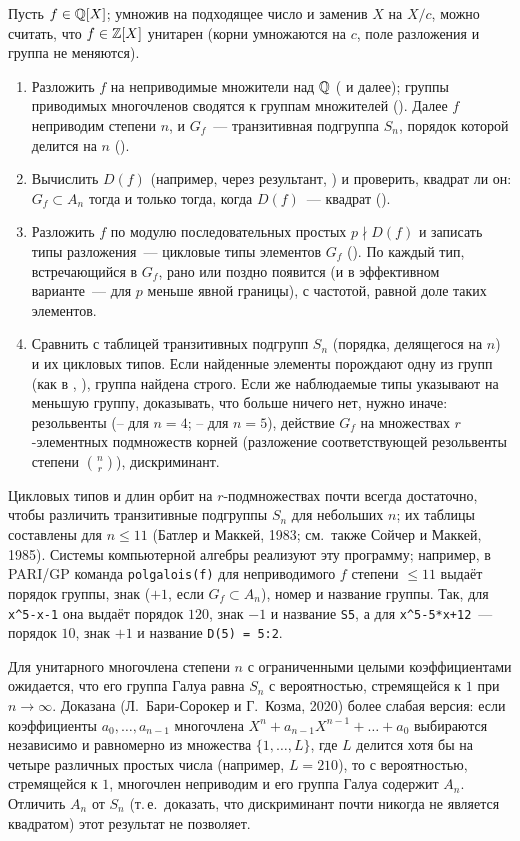 \begin{remark}
Пусть $f\in\mathbb Q[X]$; умножив на подходящее число и заменив $X$ на $X/c$, можно считать, что $f\in\mathbb Z[X]$ унитарен (корни
умножаются на $c$, поле разложения и группа не меняются).
\begin{enumerate}[leftmargin=*]
\item Разложить $f$ на неприводимые множители над $\mathbb Q$ ( и далее); группы приводимых многочленов сводятся к
группам множителей (). Далее $f$ неприводим степени $n$, и $G_f$~--- транзитивная подгруппа $S_n$, порядок
которой делится на $n$ ().
\item Вычислить $D(f)$ (например, через результант, ) и проверить, квадрат ли он: $G_f\subset A_n$ тогда и только
тогда, когда $D(f)$~--- квадрат ().
\item Разложить $f$ по модулю последовательных простых $p\nmid D(f)$ и записать типы разложения~--- цикловые типы
элементов $G_f$ (). По  каждый тип, встречающийся в $G_f$, рано или поздно появится (и в эффективном
варианте~--- для $p$ меньше явной границы), с частотой, равной доле таких элементов.
\item Сравнить с таблицей транзитивных подгрупп $S_n$ (порядка, делящегося на $n$) и их цикловых типов. Если
найденные элементы порождают одну из групп (как в , ), группа найдена строго. Если же наблюдаемые типы
указывают на меньшую группу, доказывать, что больше ничего нет, нужно иначе: резольвенты (-- для $n=4$; --
для $n=5$), действие $G_f$ на множествах $r$-элементных подмножеств корней
(разложение соответствующей резольвенты степени $\binom nr$), дискриминант.
\end{enumerate}
Цикловых типов и длин орбит на $r$-подмножествах почти всегда достаточно, чтобы различить транзитивные подгруппы $S_n$
для небольших $n$; их таблицы составлены для $n\le11$ (Батлер и Маккей, 1983; см.\ также Сойчер и Маккей, 1985). Системы
компьютерной алгебры реализуют эту программу; например, в PARI/GP команда \texttt{polgalois(f)} для неприводимого $f$
степени $\le11$ выдаёт порядок группы, знак ($+1$, если $G_f\subset A_n$), номер и название группы. Так,
для \texttt{x\^{}5-x-1} она выдаёт порядок $120$, знак $-1$ и название \texttt{S5}, а для \texttt{x\^{}5-5*x+12}~--- порядок
$10$, знак $+1$ и название \texttt{D(5) = 5:2}.
\end{remark}

\begin{aside}[4.33]
Для унитарного многочлена степени $n$ с ограниченными целыми коэффициентами ожидается, что его группа Галуа равна $S_n$
с вероятностью, стремящейся к $1$ при $n\to\infty$. Доказана (Л.~Бари-Сорокер и Г.~Козма, 2020) более слабая версия:
если коэффициенты $a_0,\dots,a_{n-1}$ многочлена $X^n+a_{n-1}X^{n-1}+\dots+a_0$ выбираются независимо и равномерно из
множества $\{1,\dots,L\}$, где $L$ делится хотя бы на четыре различных простых числа (например, $L=210$), то с
вероятностью, стремящейся к $1$, многочлен неприводим и его группа Галуа содержит $A_n$. Отличить $A_n$ от $S_n$
(т.\,е.\ доказать, что дискриминант почти никогда не является квадратом) этот результат не позволяет.
\end{aside}

